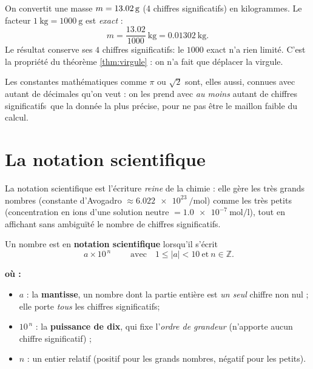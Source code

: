 \documentclass[11pt,a4paper]{article}
\newenvironment{ou}{%
  \par\smallskip\noindent\textbf{où :}\nopagebreak
  \begin{itemize}[leftmargin=1.8em,topsep=2pt,itemsep=1.5pt,parsep=0pt]}%
  {\end{itemize}}
\newcommand{\cs}{chiffre significatif}
\newcommand{\CS}{chiffres significatifs}
\begin{document}
\begin{exemple}
On convertit une masse $m=\qty{13{,}02}{\gram}$ (4 \CS) en kilogrammes. Le facteur
$\qty{1}{\kilo\gram}=\qty{1000}{\gram}$ est \emph{exact} :
\[ m=\frac{\num{13,02}}{\num{1000}}\ \si{\kilo\gram}=\qty{0,01302}{\kilo\gram}. \]
Le résultat conserve ses $4$ \CS : le $\num{1000}$ exact n'a rien limité. C'est la propriété du
théorème \ref{thm:virgule} : on n'a fait que déplacer la virgule.
\end{exemple}

\begin{remarque}
Les constantes mathématiques comme $\pi$ ou $\sqrt{2}$ sont, elles aussi, connues avec autant de
décimales qu'on veut : on les prend avec \emph{au moins} autant de \CS\ que la donnée la plus précise,
pour ne pas être le maillon faible du calcul.
\end{remarque}

\section{La notation scientifique}
La notation scientifique est l'écriture \emph{reine} de la chimie : elle gère les très grands nombres
(constante d'Avogadro $\approx \qty{6,022e23}{\per\mole}$) comme les très petits
(concentration en ions  d'une solution neutre $=\qty{1,0e-7}{\mol\per\litre}$), tout en
affichant sans ambiguïté le nombre de \CS.

\begin{definition}
Un nombre est en \textbf{notation scientifique} lorsqu'il s'écrit
\[ \boxed{\;a\times 10^{\,n}\;}\qquad\text{avec}\quad 1\le |a| < 10\ \text{et}\ n\in\mathbb{Z}. \]
\begin{ou}
  \item $a$ : la \textbf{mantisse}, un nombre dont la partie entière est \emph{un seul} chiffre non nul ; elle porte \emph{tous} les \CS ;
  \item $10^{\,n}$ : la \textbf{puissance de dix}, qui fixe l'\emph{ordre de grandeur} (n'apporte aucun \cs) ;
  \item $n$ : un entier relatif (positif pour les grands nombres, négatif pour les petits).
\end{ou}
\end{definition}
\end{document}
